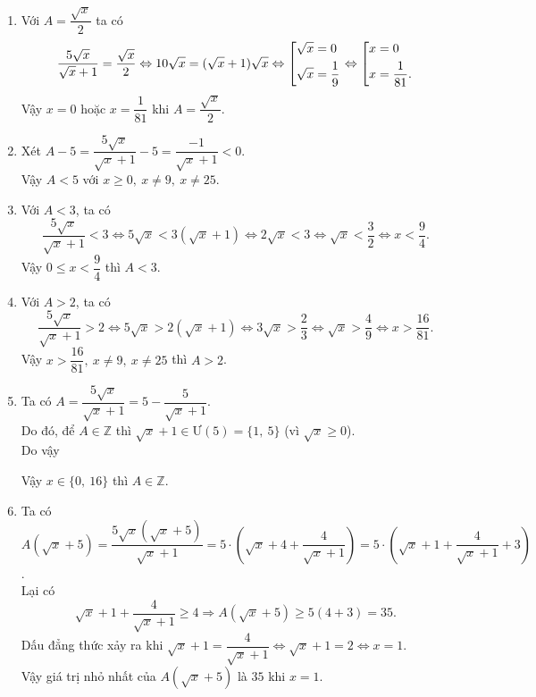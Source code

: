 \begin{bt}
{\begin{enumerate}
			\item Với $ A=\dfrac{\sqrt{x}}{2} $ ta có
			\[ 
			\dfrac{5\sqrt{x}}{\sqrt{x}+1}=\dfrac{\sqrt{x}}{2}\Leftrightarrow 10\sqrt{x}=(\sqrt{x}+1)\sqrt{x}\Leftrightarrow\left[\begin{aligned}&\sqrt{x}=0\\ &\sqrt{x}=\dfrac{1}{9}\end{aligned}\right.\Leftrightarrow\left[\begin{aligned}&x=0\\ &x=\dfrac{1}{81}.\end{aligned}\right.
			\]
			Vậy $ x=0$ hoặc $x=\dfrac{1}{81}$ khi $ A=\dfrac{\sqrt{x}}{2} $.
			\item Xét $ A-5=\dfrac{5\sqrt{x}}{\sqrt{x}+1}-5=\dfrac{-1}{\sqrt{x}+1}<0$.\\
			Vậy $ A<5 $ với $ x\geq 0,\ x\neq 9,\ x\neq 25 $.
			\item Với $ A<3 $, ta có 
			\[
			\dfrac{5\sqrt{x}}{\sqrt{x}+1}<3\Leftrightarrow 5\sqrt{x}<3(\sqrt{x}+1)\Leftrightarrow 2\sqrt{x}<3\Leftrightarrow \sqrt{x}<\dfrac{3}{2}\Leftrightarrow x< \dfrac{9}{4}.
			\]
			Vậy $ 0\leq x<\dfrac{9}{4} $ thì $ A<3 $.
			\item Với $ A>2 $, ta có 
			\[
			\dfrac{5\sqrt{x}}{\sqrt{x}+1}>2\Leftrightarrow 5\sqrt{x}>2(\sqrt{x}+1)\Leftrightarrow 3\sqrt{x}>\dfrac{2}{3}\Leftrightarrow \sqrt{x}>\dfrac{4}{9}\Leftrightarrow x>\dfrac{16}{81}.
			\]
			Vậy $ x>\dfrac{16}{81},\ x\neq 9,\ x\neq 25 $ thì $ A>2 $.			
			\item Ta có $ A=\dfrac{5\sqrt{x}}{\sqrt{x}+1}=5-\dfrac{5}{\sqrt{x}+1} $.\\
			Do đó, để $ A\in \mathbb{Z} $ thì $ \sqrt{x}+1\in\text{Ư}(5)=\{1,\ 5\} $ (vì $ \sqrt{x}\geq 0 $).\\
			Do vậy
			\begin{center}
			\end{center}
			Vậy $ x\in\{0,\ 16\} $ thì $ A\in\mathbb{Z} $.
			\item Ta có $ A(\sqrt{x}+5)=\dfrac{5\sqrt{x}(\sqrt{x}+5)}{\sqrt{x}+1}=5\cdot\left(\sqrt{x}+4+\dfrac{4}{\sqrt{x}+1}\right)=5\cdot\left(\sqrt{x}+1+\dfrac{4}{\sqrt{x}+1}+3\right) $.\\
			Lại có
			\[ 
			\sqrt{x}+1+\dfrac{4}{\sqrt{x}+1}\geq 4\Rightarrow A(\sqrt{x}+5)\geq 5(4+3)=35.
			\]
			Dấu đẳng thức xảy ra khi $ \sqrt{x}+1=\dfrac{4}{\sqrt{x}+1}\Leftrightarrow \sqrt{x}+1=2\Leftrightarrow x=1 $.\\
			Vậy giá trị nhỏ nhất của $ A(\sqrt{x}+5) $ là $ 35 $ khi $ x=1 $.
		\end{enumerate}
	}
\end{bt}
